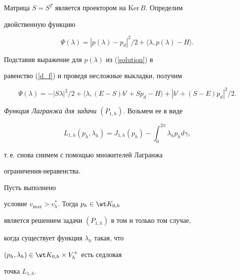 Матрица $S=S^T$ является проектором на $\mathrm{Ker}\, B$. Определим


двойственную функцию


\begin{equation}\label{d_f}


\Psi(\lambda)=|p(\lambda)-p_d|^2/2+\langle \lambda,


p(\lambda)-H\rangle.


\end{equation}


Подставив выражение для $p(\lambda)$ из (\ref{solution}) в


равенство (\ref{d_f}) и проведя несложные выкладки, получим


\begin{equation}\label{d_f1}


\Psi(\lambda)=-|S \lambda|^2/2+\langle


\lambda,(E-S)b'+Sp_d-H\rangle+|b'+(S-E)p_d|^2/2.


\end{equation}


\medskip





{\it Функция Лагранжа для задачи $(P_{1,h})$.} Возьмем ее в виде


$$




L_{1,h}(p_h,\lambda_h)=J_{1,h}(p_h)-\int_{0}^{2\pi} \lambda_h p_h


d\gamma,




$$


т.\,е. снова снимем с помощью множителей Лагранжа


ограничения-неравенства.





\begin{thm}


Пусть выполнено


условие $v_{\max}>v_h^{*}$. Тогда $p_h \in \wt K_{0,h}$


является решением задачи $(P_{1,h})$ в том и только том случае,


когда существует функция $\lambda_h $ такая, что


$(p_h,\lambda_h)\in \wt K_{0,h}\times V_h^{+}$ есть седловая


точка $L_{1,h}$.


\end{thm}





